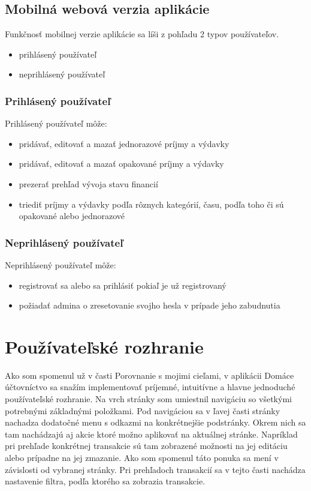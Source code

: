\documentclass[12pt,onesided]{book}
\begin{document}
\subsection{Mobilná webová verzia aplikácie}
Funkčnosť mobilnej verzie aplikácie sa líši z pohľadu 2 typov používateľov.
\begin{itemize}
\item{prihlásený používateľ}
\item{neprihlásený používateľ}
\end{itemize}

\subsubsection{Prihlásený používateľ}
Prihlásený používateľ môže:
\begin{itemize}
\item{pridávať, editovať a mazať jednorazové príjmy a výdavky}
\item{pridávať, editovať a mazať opakované príjmy a výdavky}
\item{prezerať prehľad vývoja stavu financií}
\item{triediť príjmy a výdavky podľa rôznych kategórií, času, podľa toho či sú opakované alebo jednorazové}
\end{itemize}

\subsubsection{Neprihlásený používateľ}
Neprihlásený používateľ môže:
\begin{itemize}
\item{registrovať sa alebo sa prihlásiť pokiaľ je už registrovaný}
\item{požiadať admina o zresetovanie svojho hesla v prípade jeho zabudnutia}
\end{itemize}

\section{Používateľské rozhranie}
Ako som spomenul už v časti Porovnanie s mojimi cieľami, v aplikácii Domáce účtovníctvo sa snažím implementovať príjemné, intuitívne a hlavne jednoduché používateľské rozhranie. Na vrch stránky som umiestnil navigáciu so všetkými potrebnými základnými položkami. Pod navigáciou sa v ľavej časti stránky nachadza dodatočné menu s odkazmi na konkrétnejšie podstránky. Okrem nich sa tam nachádzajú aj akcie ktoré možno aplikovať na aktuálnej stránke. Napríklad pri prehľade konkrétnej transakcie sú tam zobrazené možnosti na jej editáciu alebo prípadne na jej zmazanie. Ako som spomenul táto ponuka sa mení v závislosti od vybranej stránky. Pri prehľadoch transakcií sa v tejto časti nachádza nastavenie filtra, podľa ktorého sa zobrazia transakcie.
\end{document}
